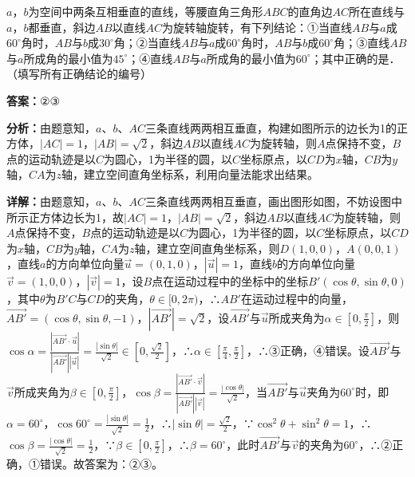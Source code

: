 \begin{question}[points=5]
$a$，$b$为空间中两条互相垂直的直线，等腰直角三角形$ABC$的直角边$AC$所在直线与$a$，$b$都垂直，斜边$AB$以直线$AC$为旋转轴旋转，有下列结论：①当直线$AB$与$a$成$60^\circ$角时，$AB$与$b$成$30^\circ$角；②当直线$AB$与$a$成$60^\circ$角时，$AB$与$b$成$60^\circ$角；③直线$AB$与$a$所成角的最小值为$45^\circ$；④直线$AB$与$a$所成角的最小值为$60^\circ$；其中正确的是．（填写所有正确结论的编号）
\fillin[{$②③$}]
\begin{solution}
\textbf{答案：}$②③$

\textbf{分析：}由题意知，$a$、$b$、$AC$三条直线两两相互垂直，构建如图所示的边长为1的正方体，$|AC|=1$，$|AB|=\sqrt{2}$，斜边$AB$以直线$AC$为旋转轴，则$A$点保持不变，$B$点的运动轨迹是以$C$为圆心，1为半径的圆，以$C$坐标原点，以$CD$为$x$轴，$CB$为$y$轴，$CA$为$z$轴，建立空间直角坐标系，利用向量法能求出结果。

\textbf{详解：}由题意知，$a$、$b$、$AC$三条直线两两相互垂直，画出图形如图，不妨设图中所示正方体边长为1，故$|AC|=1$，$|AB|=\sqrt{2}$，斜边$AB$以直线$AC$为旋转轴，则$A$点保持不变，$B$点的运动轨迹是以$C$为圆心，1为半径的圆，以$C$坐标原点，以$CD$为$x$轴，$CB$为$y$轴，$CA$为$z$轴，建立空间直角坐标系，则$D(1,0,0)$，$A(0,0,1)$，直线$a$的方向单位向量$\overrightarrow{u}=(0,1,0)$，$|\overrightarrow{u}|=1$，直线$b$的方向单位向量$\overrightarrow{v}=(1,0,0)$，$|\overrightarrow{v}|=1$，设$B$点在运动过程中的坐标中的坐标$B'(\cos\theta,\sin\theta,0)$，其中$\theta$为$B'C$与$CD$的夹角，$\theta\in[0,2\pi)$，∴$AB'$在运动过程中的向量，$\overrightarrow{AB'}=(\cos\theta,\sin\theta,-1)$，$|\overrightarrow{AB'}|=\sqrt{2}$，设$\overrightarrow{AB'}$与$\overrightarrow{u}$所成夹角为$\alpha\in[0,\frac{\pi}{2}]$，则$\cos\alpha=\frac{|\overrightarrow{AB'}\cdot\overrightarrow{u}|}{|\overrightarrow{AB'}||\overrightarrow{u}|}=\frac{|\sin\theta|}{\sqrt{2}}\in[0,\frac{\sqrt{2}}{2}]$，∴$\alpha\in[\frac{\pi}{4},\frac{\pi}{2}]$，∴③正确，④错误。设$\overrightarrow{AB'}$与$\overrightarrow{v}$所成夹角为$\beta\in[0,\frac{\pi}{2}]$，$\cos\beta=\frac{|\overrightarrow{AB'}\cdot\overrightarrow{v}|}{|\overrightarrow{AB'}||\overrightarrow{v}|}=\frac{|\cos\theta|}{\sqrt{2}}$，当$\overrightarrow{AB'}$与$\overrightarrow{u}$夹角为$60^\circ$时，即$\alpha=60^\circ$，$\cos60^\circ=\frac{|\sin\theta|}{\sqrt{2}}=\frac{1}{2}$，∴$|\sin\theta|=\frac{\sqrt{2}}{2}$，∵$\cos^2\theta+\sin^2\theta=1$，∴$\cos\beta=\frac{|\cos\theta|}{\sqrt{2}}=\frac{1}{2}$，∵$\beta\in[0,\frac{\pi}{2}]$，∴$\beta=60^\circ$，此时$\overrightarrow{AB'}$与$\overrightarrow{v}$的夹角为$60^\circ$，∴②正确，①错误。故答案为：②③。
\end{solution}
\end{question}

